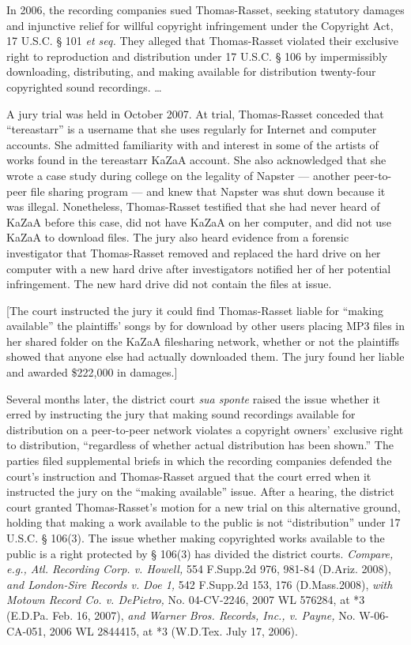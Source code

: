 In 2006, the recording companies sued Thomas-Rasset, seeking statutory damages
and injunctive relief for willful copyright infringement under the Copyright
Act, 17 U.S.C. {\S} 101 \textit{et seq.} They alleged that Thomas-Rasset
violated their exclusive right to reproduction and distribution under 17 U.S.C.
{\S} 106 by impermissibly downloading, distributing, and making available for
distribution twenty-four copyrighted sound recordings. {\dots}

A jury trial was held in October 2007. At trial, Thomas-Rasset conceded that
``tereastarr'' is a username that she uses regularly for Internet and computer
accounts. She admitted familiarity with and interest in some of the artists of
works found in the tereastarr KaZaA account. She also acknowledged that she
wrote a case study during college on the legality of Napster --- another
peer-to-peer file sharing program --- and knew that Napster was shut down
because it was illegal. Nonetheless, Thomas-Rasset testified that she had never
heard of KaZaA before this case, did not have KaZaA on her computer, and did
not use KaZaA to download files. The jury also heard evidence from a forensic
investigator that Thomas-Rasset removed and replaced the hard drive on her
computer with a new hard drive after investigators notified her of her
potential infringement. The new hard drive did not contain the files at issue.

[The court instructed the jury it could find Thomas-Rasset liable for ``making
available'' the plaintiffs' songs by for download by other users placing MP3
files in her shared folder on the KaZaA filesharing network, whether or not the
plaintiffs showed that anyone else had actually downloaded them. The jury found
her liable and awarded \$222,000 in damages.]

Several months later, the district court \textit{sua sponte} raised the issue
whether it erred by instructing the jury that making sound recordings available
for distribution on a peer-to-peer network violates a copyright owners'
exclusive right to distribution, ``regardless of whether actual distribution
has been shown.'' The parties filed supplemental briefs in which the recording
companies defended the court's instruction and Thomas-Rasset argued that the
court erred when it instructed the jury on the ``making available'' issue.
After a hearing, the district court granted Thomas-Rasset's motion for a new
trial on this alternative ground, holding that making a work available to the
public is not ``distribution'' under 17 U.S.C. {\S} 106(3). The issue whether
making copyrighted works available to the public is a right protected by {\S}
106(3) has divided the district courts. \textit{Compare, e.g., Atl. Recording
Corp. v. Howell,} 554 F.Supp.2d 976, 981-84 (D.Ariz. 2008), \textit{and
London-Sire Records v. Doe 1,} 542 F.Supp.2d 153, 176 (D.Mass.2008),
\textit{with Motown Record Co. v. DePietro,} No. 04-CV-2246, 2007 WL 576284, at
*3 (E.D.Pa. Feb. 16, 2007), \textit{and Warner Bros. Records, Inc., v. Payne,}
No. W-06-CA-051, 2006 WL 2844415, at *3 (W.D.Tex. July 17, 2006).

